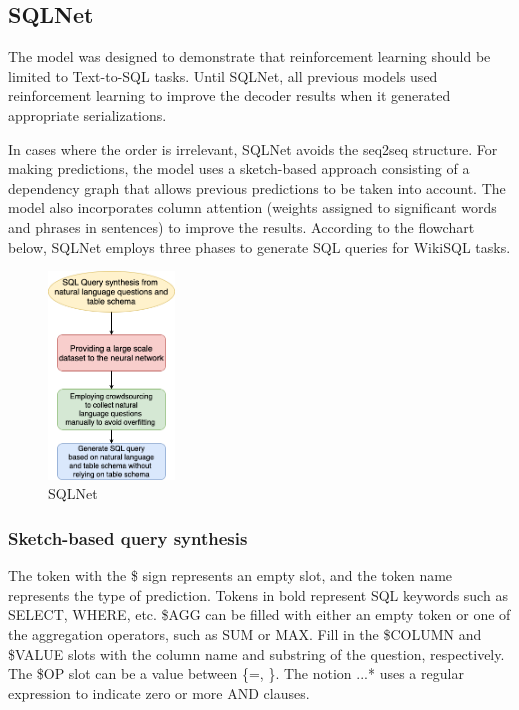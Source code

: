 \subsection{SQLNet} \label{sec:sqlnet}

The model was designed to demonstrate that reinforcement learning should be limited to Text-to-SQL tasks.
Until SQLNet\cite{xu_sqlnet_2017}, all previous models used reinforcement learning to improve the decoder results when it generated appropriate serializations.


In cases where the order is irrelevant, SQLNet avoids the seq2seq structure.
For making predictions, the model uses a sketch-based approach consisting of a dependency graph that allows previous predictions to be taken into account.
The model also incorporates column attention (weights assigned to significant words and phrases in sentences) to improve the results. According to the flowchart below, SQLNet employs three phases to generate SQL queries for WikiSQL tasks.

\begin{figure}[htb]
    \centering
    \includegraphics[width=0.3\textwidth]{pics/sqlnet/sqlnet.png}
    \caption{SQLNet\cite{xu_sqlnet_2017}}
    \label{fig:sqlnet}
\end{figure}

\subsubsection*{Sketch-based query synthesis}

The token with the \$ sign represents an empty slot, and the token name represents the type of prediction. Tokens in bold represent SQL keywords such as SELECT, WHERE, etc.
\$AGG can be filled with either an empty token or one of the aggregation operators, such as SUM or MAX. Fill in the \$COLUMN and \$VALUE slots with the column name and substring of the question, respectively. The \$OP slot can be a value between \{=, \}. The notion \(...\)* uses a regular expression to indicate zero or more AND clauses.


